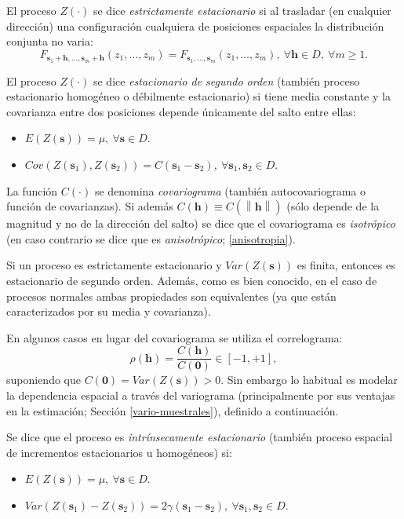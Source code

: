 \documentclass[
  spanish,
]{book}
\theoremstyle{break}
\theoremstyle{definition}
\theoremstyle{definition}
\theoremstyle{definition}
\theoremstyle{definition}
\theoremstyle{remark}
\begin{document}
El proceso \(Z(\cdot)\) se dice \emph{estrictamente estacionario} si al trasladar (en cualquier dirección) una configuración cualquiera de posiciones espaciales la distribución conjunta no varia:
\[F_{\mathbf{s}_1 +\mathbf{h}, \ldots,\mathbf{s}_m +\mathbf{h}}(z_1, \ldots, z_m) = F_{\mathbf{s}_1, \ldots, \mathbf{s}_m}(z_1, \ldots, z_m),\ \forall \mathbf{h}\in D,\ \forall m\geq 1.\]

El proceso \(Z(\cdot)\) se dice \emph{estacionario de segundo orden} (también proceso estacionario homogéneo o débilmente estacionario) si tiene media constante y la covarianza entre dos posiciones depende únicamente del salto entre ellas:

\begin{itemize}
\item
  \(E(Z(\mathbf{s}))=\mu,\ \forall \mathbf{s}\in D\).
\item
  \(Cov(Z(\mathbf{s}_1), Z(\mathbf{s}_2)) = C(\mathbf{s}_1 -\mathbf{s}_2),\ \forall \mathbf{s}_1 ,\mathbf{s}_2 \in D\).
\end{itemize}

La función \(C(\cdot)\) se denomina \emph{covariograma} (también autocovariograma o función de covarianzas).
Si además \(C(\mathbf{h}) \equiv C(\left\| \mathbf{h}\right\|)\) (sólo depende de la magnitud y no de la dirección del salto) se dice que el covariograma es \emph{isotrópico} (en caso contrario se dice que es \emph{anisotrópico}; \ref{anisotropia}).

Si un proceso es estrictamente estacionario y \(Var(Z(\mathbf{s}))\) es finita, entonces es estacionario de segundo orden.
Además, como es bien conocido, en el caso de procesos normales ambas propiedades son equivalentes (ya que están caracterizados por su media y covarianza).

En algunos casos en lugar del covariograma se utiliza el correlograma:
\[\rho (\mathbf{h}) = \dfrac{C(\mathbf{h})}{C(\mathbf{0})} \in \left[-1,+1\right],\]
suponiendo que \(C(\mathbf{0}) = Var(Z(\mathbf{s})) >0\).
Sin embargo lo habitual es modelar la dependencia espacial a través del variograma (principalmente por sus ventajas en la estimación; Sección \ref{vario-muestrales}), definido a continuación.

Se dice que el proceso es \emph{intrínsecamente estacionario} (también proceso espacial de incrementos estacionarios u homogéneos) si:

\begin{itemize}
\item
  \(E(Z(\mathbf{s}))=\mu,\ \forall \mathbf{s}\in D\).
\item
  \(Var(Z(\mathbf{s}_1)-Z(\mathbf{s}_2)) = 2\gamma (\mathbf{s}_1 - \mathbf{s}_2),\ \forall \mathbf{s}_1 ,\mathbf{s}_2 \in D\).
\end{itemize}
\end{document}
